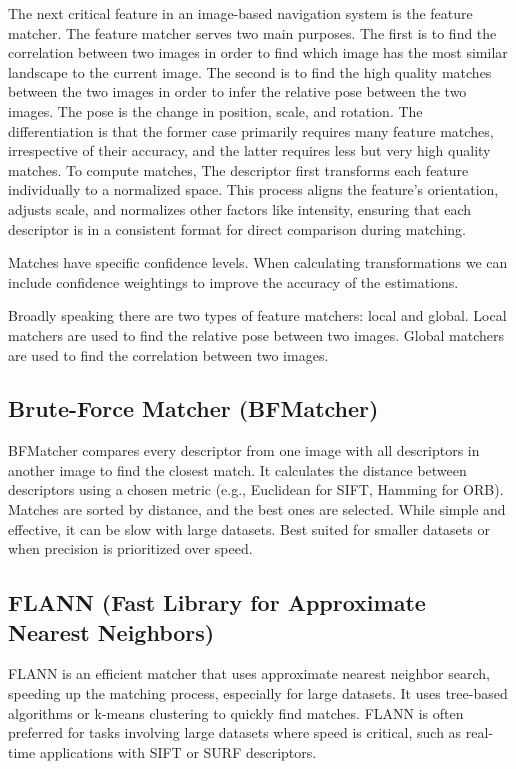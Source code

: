 The next critical feature in an image-based navigation system is the feature matcher. The feature matcher serves two main purposes. The first is to find the correlation between two images in order to find which image has the most similar landscape to the current image. The second is to find the high quality matches between the two images in order to infer the relative pose between the two images. The pose is the change in position, scale, and rotation. The differentiation is that the former case primarily requires many feature matches, irrespective of their accuracy, and the latter requires less but very high quality matches. 
To compute matches, The descriptor first transforms each feature individually to a normalized space. This process aligns the feature’s orientation, adjusts scale, and normalizes other factors like intensity, ensuring that each descriptor is in a consistent format for direct comparison during matching.


Matches have specific confidence levels. When calculating transformations we can include confidence weightings to improve the accuracy of the estimations. 

Broadly speaking there are two types of feature matchers: local and global. Local matchers are used to find the relative pose between two images. Global matchers are used to find the correlation between two images.

\subsection*{Brute-Force Matcher (BFMatcher)} BFMatcher compares every descriptor from one image with all descriptors in another image to find the closest match. It calculates the distance between descriptors using a chosen metric (e.g., Euclidean for SIFT, Hamming for ORB). Matches are sorted by distance, and the best ones are selected. While simple and effective, it can be slow with large datasets. Best suited for smaller datasets or when precision is prioritized over speed.

\subsection*{FLANN (Fast Library for Approximate Nearest Neighbors)} FLANN is an efficient matcher that uses approximate nearest neighbor search, speeding up the matching process, especially for large datasets. It uses tree-based algorithms or k-means clustering to quickly find matches. FLANN is often preferred for tasks involving large datasets where speed is critical, such as real-time applications with SIFT or SURF descriptors.

